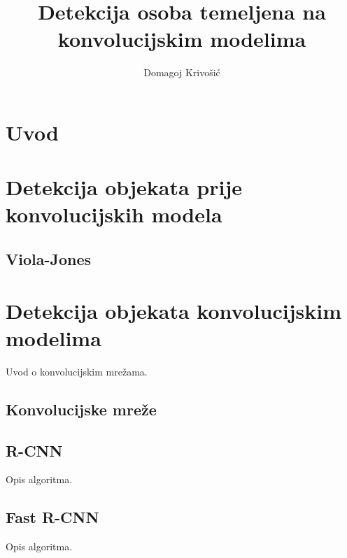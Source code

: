 \documentclass[times, utf8, diplomski]{fer}
\begin{document}

\title{Detekcija osoba temeljena na konvolucijskim modelima}

\author{Domagoj Krivošić}

\maketitle

\izvornik

\zahvala{}

\tableofcontents

\chapter{Uvod}


\chapter{Detekcija objekata prije konvolucijskih modela}


\section{Viola-Jones}


\chapter{Detekcija objekata konvolucijskim modelima}
Uvod o konvolucijskim mrežama.

\section{Konvolucijske mreže}



\section{R-CNN}
Opis algoritma.

\section{Fast R-CNN}
Opis algoritma.
\end{document}
